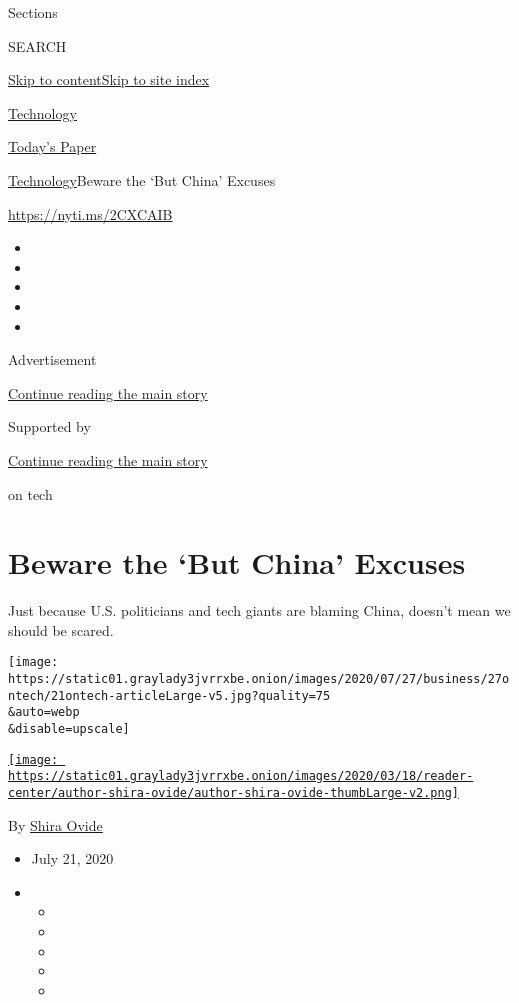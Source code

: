 Sections

SEARCH

\protect\hyperlink{site-content}{Skip to
content}\protect\hyperlink{site-index}{Skip to site index}

\href{https://www.nytimes3xbfgragh.onion/section/technology}{Technology}

\href{https://myaccount.nytimes3xbfgragh.onion/auth/login?response_type=cookie\&client_id=vi}{}

\href{https://www.nytimes3xbfgragh.onion/section/todayspaper}{Today's
Paper}

\href{/section/technology}{Technology}\textbar{}Beware the `But China'
Excuses

\url{https://nyti.ms/2CXCAIB}

\begin{itemize}
\item
\item
\item
\item
\item
\end{itemize}

Advertisement

\protect\hyperlink{after-top}{Continue reading the main story}

Supported by

\protect\hyperlink{after-sponsor}{Continue reading the main story}

on tech

\hypertarget{beware-the-but-china-excuses}{%
\section{Beware the `But China'
Excuses}\label{beware-the-but-china-excuses}}

Just because U.S. politicians and tech giants are blaming China, doesn't
mean we should be scared.

\texttt{[image: https://static01.graylady3jvrrxbe.onion/images/2020/07/27/business/27ontech/21ontech-articleLarge-v5.jpg?quality=75\\\&auto=webp\\\&disable=upscale]}

\href{https://www.nytimes3xbfgragh.onion/by/shira-ovide}{\texttt{[image: https://static01.graylady3jvrrxbe.onion/images/2020/03/18/reader-center/author-shira-ovide/author-shira-ovide-thumbLarge-v2.png]}}

By \href{https://www.nytimes3xbfgragh.onion/by/shira-ovide}{Shira Ovide}

\begin{itemize}
\item
  July 21, 2020
\item
  \begin{itemize}
  \item
  \item
  \item
  \item
  \item
  \end{itemize}
\end{itemize}

